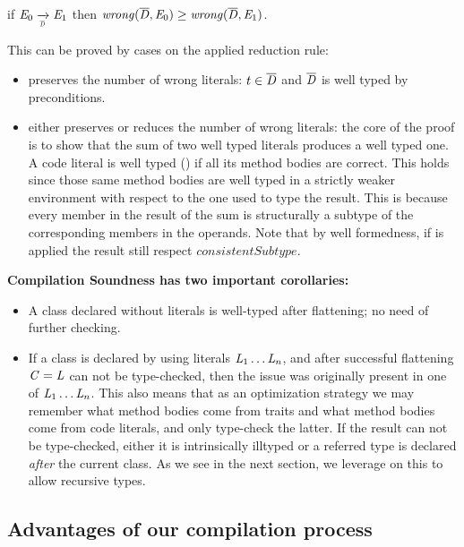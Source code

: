 \begin{theorem}

if $\mE_0 \xrightarrow[\smallDs]{} \mE_1$
then $\mathit{wrong}(\overline{\mathit{D}},\mathit{E}_0)\geq\mathit{wrong}(\overline{\mathit{D}},\mathit{E}_1)$.
\end{theorem}
\saveSpace\saveSpace\saveSpace
\noindent This can be proved by cases on the applied reduction rule:
\begin{itemize}
\item
{} preserves the number of wrong literals:
$t \in \overline{\mathit{D}}$ and $\overline{\mathit{D}}$ is well typed by  preconditions.
\item {} either preserves or reduces the number of
wrong literals:
the core of the proof is to show that the sum of two well typed literals produces a well typed one.
A code literal is well typed () if all its method bodies are correct.
This holds since those same method bodies
are well typed in a strictly weaker environment with respect to the one used to type the result.
This is because every member in the result of the sum
is structurally a subtype of
the corresponding members in the operands.
Note that by well formedness, if 
is applied the result still respect 
$\mathit{consistentSubtype}$.
\end{itemize}
\noindent 
\textbf{Compilation Soundness has two important corollaries:}
\begin{itemize}
\item A class declared without literals
is well-typed after flattening; no need of further checking.
\item If a class is declared by using literals $\mathit{L}_1\ldots\mathit{L}_n$, and after successful flattening $\mathit{C} = \mathit{L}$ can not be type-checked,
then the issue was originally present in one of $\mathit{L}_1\ldots\mathit{L}_n$.
This also means that as an optimization strategy
 we may remember what method bodies come from traits and what method bodies come from code literals, and only type-check the latter.
If the result can not be type-checked, either it is intrinsically illtyped or a 
referred type is declared \emph{after} the current class. 
As we see in the next section, we leverage on this 
to allow recursive types.
 \end{itemize}





\saveSpace
\subsection{Advantages of our compilation process}
\saveSpace

